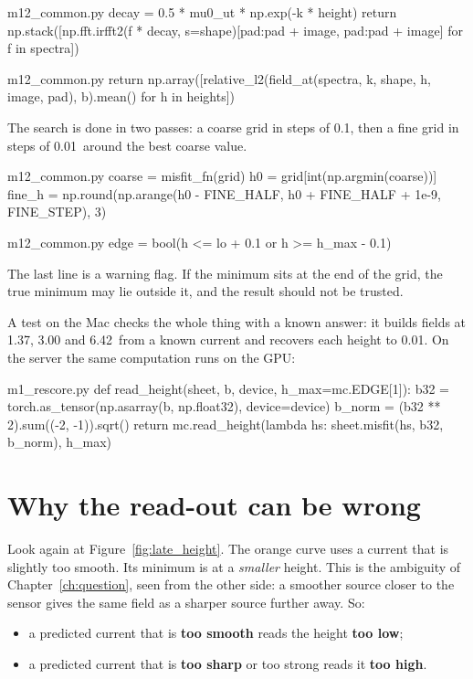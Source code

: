 \begin{code*}{m12_common.py}
    decay = 0.5 * mu0_ut * np.exp(-k * height)
    return np.stack([np.fft.irfft2(f * decay, s=shape)[pad:pad + image, pad:pad + image]
                     for f in spectra])
\end{code*}

\begin{code*}{m12_common.py}
    return np.array([relative_l2(field_at(spectra, k, shape, h, image, pad), b).mean()
                     for h in heights])
\end{code*}

The search is done in two passes: a coarse grid in steps of 0.1\um, then a fine grid in steps of 0.01\um\ around the
best coarse value.

\begin{code*}{m12_common.py}
    coarse = misfit_fn(grid)
    h0 = grid[int(np.argmin(coarse))]
    fine_h = np.round(np.arange(h0 - FINE_HALF, h0 + FINE_HALF + 1e-9, FINE_STEP), 3)
\end{code*}

\begin{code*}{m12_common.py}
    edge = bool(h <= lo + 0.1 or h >= h_max - 0.1)
\end{code*}

The last line is a warning flag. If the minimum sits at the end of the grid, the true minimum may lie outside it, and
the result should not be trusted.

A test on the Mac checks the whole thing with a known answer: it builds fields at 1.37, 3.00 and 6.42\um\ from a known
current and recovers each height to 0.01\um. On the server the same computation runs on the GPU:

\begin{code*}{m1_rescore.py}
def read_height(sheet, b, device, h_max=mc.EDGE[1]):
    b32 = torch.as_tensor(np.asarray(b, np.float32), device=device)
    b_norm = (b32 ** 2).sum((-2, -1)).sqrt()
    return mc.read_height(lambda hs: sheet.misfit(hs, b32, b_norm), h_max)
\end{code*}

\section{Why the read-out can be wrong}

Look again at Figure~\ref{fig:late_height}. The orange curve uses a current that is slightly too smooth. Its minimum is
at a \emph{smaller} height. This is the ambiguity of Chapter~\ref{ch:question}, seen from the other side: a smoother
source closer to the sensor gives the same field as a sharper source further away. So:
\begin{itemize}
\item a predicted current that is \textbf{too smooth} reads the height \textbf{too low};
\item a predicted current that is \textbf{too sharp} or too strong reads it \textbf{too high}.
\end{itemize}

